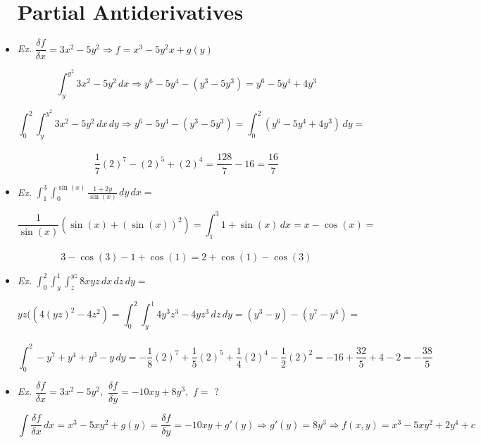 \begin{itemize}

    \section{Partial Antiderivatives}

  \item \textit{Ex. } $\dfrac{\delta f}{\delta x} = 3x^2 - 5y^2\Rightarrow f = x^3 - 5y^2x + g(y)$

  $$\displaystyle \int_{y}^{y^2} 3x^2-5y^2\,dx\Rightarrow y^6 - 5y^4 - (y^3 - 5y^3)= y^6 - 5y^4 + 4y^3$$

  \vspace{5pt}

  $$\displaystyle \int_0^2\int_{y}^{y^2} 3x^2-5y^2\,dx\,dy\Rightarrow y^6 - 5y^4 - (y^3 - 5y^3) = \displaystyle \int_0^2 (y^6 - 5y^4 + 4y^3)\,dy =$$\vspace{-15pt}\\$$ \frac{1}{7}(2)^7-(2)^5+(2)^4 = \frac{128}{7} - 16 = \frac{16}{7}$$

  \item \textit{Ex. } $\displaystyle \int_1^3 \int_0^{\sin(x)} \frac{1+2y}{\sin(x)}\,dy\,dx=$

  $$\frac{1}{\sin(x)}\left( \sin(x)+(\sin(x))^2 \right) = \int_1^3 1 + \sin(x)\,dx = x - \cos(x) =$$\vspace{-15pt}\\$$3 - \cos(3) - 1 + \cos(1) = 2 + \cos(1) - \cos(3)$$

  \item \textit{Ex. } $\displaystyle \int_0^2\int_y^1\int_z^{yz} 8xyz\,dx\,dz\,dy=$

  $$yz((4(yz)^2 - 4z^2) = \int_0^2\int_y^1 4y^3z^3 - 4yz^3\,dz\,dy = (y^3 - y) - (y^7 - y^4) =$$\vspace{-15pt} \\$$\int_0^2 -y^7 + y^4 + y^3 - y\,dy = -\frac{1}{8}(2)^7 + \frac{1}{5}(2)^5 + \frac{1}{4}(2)^4 - \frac{1}{2}(2)^2 = -16 + \frac{32}{5} + 4 - 2 = -\frac{38}{5}$$

  \item \textit{Ex. } $\dfrac{\delta f}{\delta x} = 3x^2-5y^2,\,\,\dfrac{\delta f}{\delta y} = -10xy + 8y^3,\,\, f=$ ?

    $$\int \frac{\delta f}{\delta x}\,dx = x^3 - 5xy^2 + g(y) = \frac{\delta f}{\delta y} = -10xy + g'(y)\Rightarrow g'(y) = 8y^3 \Rightarrow f(x,y) = x^3-5xy^2+2y^4 + c$$

\end{itemize}



